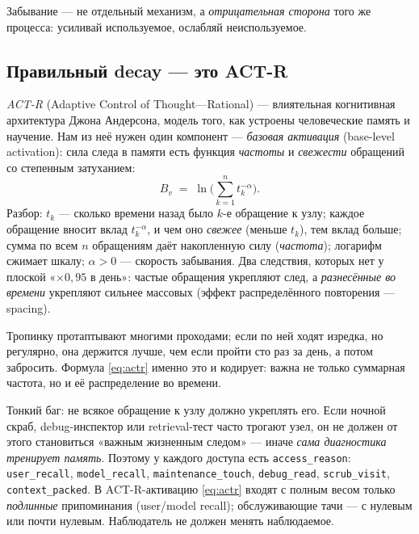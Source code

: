 Забывание — не отдельный механизм, а \emph{отрицательная сторона} того же процесса:
усиливай используемое, ослабляй неиспользуемое.

\subsection{Правильный decay — это ACT-R}

\emph{ACT-R} (Adaptive Control of Thought—Rational) — влиятельная когнитивная
архитектура Джона Андерсона, модель того, как устроены человеческие память и
научение. Нам из неё нужен один компонент — \emph{базовая активация} (base-level
activation): сила следа в памяти есть функция \emph{частоты} и \emph{свежести}
обращений со степенным затуханием:
\begin{equation}
B_v \;=\; \ln\!\Big(\sum_{k=1}^{n} t_k^{-\alpha}\Big).
\label{eq:actr}
\end{equation}
Разбор: $t_k$ — сколько времени назад было $k$-е обращение к узлу; каждое обращение
вносит вклад $t_k^{-\alpha}$, и чем оно \emph{свежее} (меньше $t_k$), тем вклад
больше; сумма по всем $n$ обращениям даёт накопленную силу (\emph{частота});
логарифм сжимает шкалу; $\alpha>0$ — скорость забывания. Два следствия, которых нет
у плоской «$\times 0{,}95$ в день»: частые обращения укрепляют след, а
\emph{разнесённые во времени} укрепляют сильнее массовых (эффект распределённого
повторения — spacing).

\begin{intuition}
Тропинку протаптывают многими проходами; если по ней ходят изредка, но регулярно,
она держится лучше, чем если пройти сто раз за день, а потом забросить. Формула
\eqref{eq:actr} именно это и кодирует: важна не только суммарная частота, но и её
распределение во времени.
\end{intuition}

\begin{pitfall}
Тонкий баг: не всякое обращение к узлу должно укреплять его. Если ночной скраб,
debug-инспектор или retrieval-тест часто трогают узел, он не должен от этого
становиться «важным жизненным следом» — иначе \emph{сама диагностика тренирует
память}. Поэтому у каждого доступа есть \texttt{access\_reason}: \texttt{user\_recall},
\texttt{model\_recall}, \texttt{maintenance\_touch}, \texttt{debug\_read},
\texttt{scrub\_visit}, \texttt{context\_packed}. В ACT-R-активацию \eqref{eq:actr}
входят с полным весом только \emph{подлинные} припоминания (user/model recall);
обслуживающие тачи — с нулевым или почти нулевым. Наблюдатель не должен менять
наблюдаемое.
\end{pitfall}

